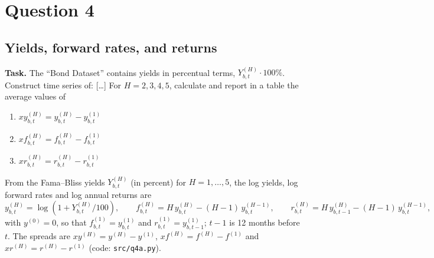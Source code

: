 \documentclass[11pt]{article}
\makeatletter
\newcommand{\xr}{\mathit{xr}}
\newcommand{\xy}{\mathit{xy}}
\newcommand{\xf}{\mathit{xf}}
\newcommand{\task}[1]{\par\if@nobreak\else\needspace{5\baselineskip}\fi\medskip\noindent
  \begin{minipage}{\linewidth}\textbf{Task.} #1\end{minipage}\par   %
  \nopagebreak\medskip\@afterheading}   %
\makeatother
\begin{document}
\section{Question 4}

\subsection{Yields, forward rates, and returns}

\task{The ``Bond Dataset'' contains yields in percentual terms, $Y^{(H)}_{b,t} \cdot 100\%$.
Construct time series of: [\dots] For $H = 2, 3, 4, 5$, calculate and report in a table the
average values of
\begin{enumerate}[label=(\roman*), nosep, leftmargin=2.5em]
  \item $\xy^{(H)}_{b,t} = y^{(H)}_{b,t} - y^{(1)}_{b,t}$
  \item $\xf^{(H)}_{b,t} = f^{(H)}_{b,t} - f^{(1)}_{b,t}$
  \item $\xr^{(H)}_{b,t} = r^{(H)}_{b,t} - r^{(1)}_{b,t}$
\end{enumerate}}

From the Fama--Bliss yields $Y^{(H)}_{b,t}$ (in percent) for $H = 1, \dots, 5$, the log yields,
log forward rates and log annual returns are
\begin{equation}
  y^{(H)}_{b,t} = \log\!\left(1 + Y^{(H)}_{b,t}/100\right), \qquad
  f^{(H)}_{b,t} = H\, y^{(H)}_{b,t} - (H-1)\, y^{(H-1)}_{b,t}, \qquad
  r^{(H)}_{b,t} = H\, y^{(H)}_{b,t-1} - (H-1)\, y^{(H-1)}_{b,t},
  \label{eq:q4a_defs}
\end{equation}
with $y^{(0)} = 0$, so that $f^{(1)}_{b,t} = y^{(1)}_{b,t}$ and $r^{(1)}_{b,t} = y^{(1)}_{b,t-1}$;
$t-1$ is 12 months before $t$. The spreads are $\xy^{(H)} = y^{(H)} - y^{(1)}$,
$\xf^{(H)} = f^{(H)} - f^{(1)}$ and $\xr^{(H)} = r^{(H)} - r^{(1)}$
(code: \texttt{src/q4a.py}).

\begin{table}[H]
  \centering
  
  \caption{Average yield spreads, forward spreads and excess log returns of $H$-year
  Fama--Bliss discount bonds over the 1-year bond, $H = 2, \dots, 5$, in percent per year.
  Monthly observations over the common sample on which all three series are defined,
  1953:06--2024:12.}
  \label{tab:q4a}
\end{table}
\end{document}
